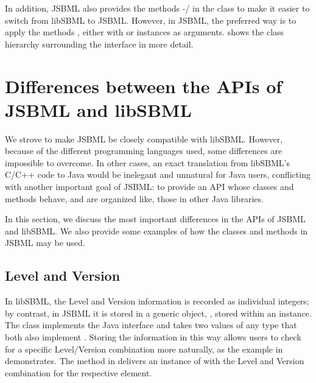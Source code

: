 In addition, JSBML also provides the methods
-/ in the \InitialAssignment class
to make it easier to switch from libSBML to JSBML.  However, in JSBML, the
preferred way  is to apply the
methods , either with \String or \Variable instances as
arguments.   shows the class
hierarchy surrounding the \Assignment interface in more detail.


\section{Differences between the APIs of JSBML and libSBML}
\label{sec:api-differences}

We strove to make JSBML be closely compatible with libSBML. However,
because of the different programming languages used,
some differences are impossible to overcome.
In other cases, an exact translation from libSBML's C/C++ 
code to Java would be inelegant and unnatural for Java users,
conflicting with another important goal of JSBML: to provide
an API  whose classes and
methods behave, and are organized like, those in other Java libraries.

In this section, we discuss the most important differences in the APIs of
JSBML  and libSBML.
 We also provide some
examples of how the classes and methods in JSBML may be used.


\subsection{Level and Version }

In libSBML, the Level and Version information is recorded as individual
integers; by contrast, in JSBML it is stored in a generic object, \ValuePair,
stored within an \AbstractSBase instance. The class \ValuePair implements the
Java interface \Comparable and takes two values of any type that both also
implement \Comparable.  Storing the information in this way allows users to
check for a specific Level/Version combination more naturally, as the example
in  demonstrates. The method
 in \AbstractSBase delivers an instance of
\ValuePair with the Level and Version combination for the respective element.

